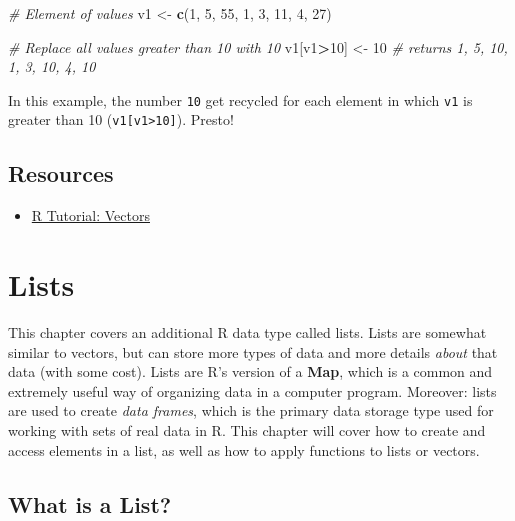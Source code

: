 \documentclass[]{book}
\newenvironment{Shaded}{\begin{snugshade}}{\end{snugshade}}
\newcommand{\KeywordTok}[1]{\textcolor[rgb]{0.13,0.29,0.53}{\textbf{#1}}}
\newcommand{\DecValTok}[1]{\textcolor[rgb]{0.00,0.00,0.81}{#1}}
\newcommand{\StringTok}[1]{\textcolor[rgb]{0.31,0.60,0.02}{#1}}
\newcommand{\CommentTok}[1]{\textcolor[rgb]{0.56,0.35,0.01}{\textit{#1}}}
\newcommand{\OperatorTok}[1]{\textcolor[rgb]{0.81,0.36,0.00}{\textbf{#1}}}
\newcommand{\NormalTok}[1]{#1}
\providecommand{\tightlist}{%
  \setlength{\itemsep}{0pt}\setlength{\parskip}{0pt}}
\theoremstyle{definition}
\theoremstyle{definition}
\theoremstyle{remark}
\begin{document}
\begin{Shaded}
\begin{Highlighting}[]
\CommentTok{# Element of values}
\NormalTok{v1 <-}\StringTok{ }\KeywordTok{c}\NormalTok{(}\DecValTok{1}\NormalTok{, }\DecValTok{5}\NormalTok{, }\DecValTok{55}\NormalTok{, }\DecValTok{1}\NormalTok{, }\DecValTok{3}\NormalTok{, }\DecValTok{11}\NormalTok{, }\DecValTok{4}\NormalTok{, }\DecValTok{27}\NormalTok{)}

\CommentTok{# Replace all values greater than 10 with 10}
\NormalTok{v1[v1}\OperatorTok{>}\DecValTok{10}\NormalTok{] <-}\StringTok{ }\DecValTok{10}  \CommentTok{# returns 1, 5, 10, 1, 3, 10, 4, 10}
\end{Highlighting}
\end{Shaded}

In this example, the number \texttt{10} get recycled for each element in
which \texttt{v1} is greater than 10
(\texttt{v1{[}v1\textgreater{}10{]}}). Presto!

\section*{Resources}\label{resources-6}


\begin{itemize}
\tightlist
\item
  \href{http://www.r-tutor.com/r-introduction/vector}{R Tutorial:
  Vectors}
\end{itemize}

\hypertarget{lists}{\chapter{Lists}\label{lists}}

This chapter covers an additional R data type called lists. Lists are
somewhat similar to vectors, but can store more types of data and more
details \emph{about} that data (with some cost). Lists are R's version
of a \textbf{Map}, which is a common and extremely useful way of
organizing data in a computer program. Moreover: lists are used to
create \emph{data frames}, which is the primary data storage type used
for working with sets of real data in R. This chapter will cover how to
create and access elements in a list, as well as how to apply functions
to lists or vectors.

\section{What is a List?}\label{what-is-a-list}
\end{document}
